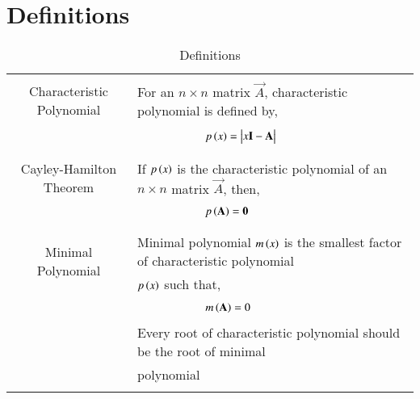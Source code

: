 \documentclass[journal,12pt]{IEEEtran}
\begin{document}
\section{\textbf{Definitions}}
\renewcommand{\thetable}{1}
\begin{table}[ht!]
\centering
\begin{tabular}{|c|l|}
    \hline
	\multirow{3}{*}{Characteristic Polynomial} 
	& \\
	& For an $n\times n$ matrix $\vec{A}$, characteristic polynomial is defined by,\\
	&\\
	& $\qquad\qquad\qquad p\brak{x}=\mydet{x\Vec{I}-\Vec{A}}$\\
	&\\
	\hline
	\multirow{3}{*}{Cayley-Hamilton Theorem}
    &\\
    & If $p\left(x\right)$ is the characteristic polynomial of an $n\times n$ matrix $\vec{A}$, then,\\
    &\\
    &$\qquad \qquad \qquad p\left(\mathbf{A}\right)=\mathbf{0}$\\
    &\\
    \hline
	\multirow{3}{*}{Minimal Polynomial} 
	&\\
	& Minimal polynomial $m\left(x\right)$ is the smallest factor of characteristic polynomial\\
	& $p\left(x\right)$ such that,\\
	&\\
	& $\qquad \qquad \qquad m\left(\mathbf{A}\right)=0$\\
	& \\
	& Every root of characteristic polynomial should be the root of minimal\\
	& polynomial\\
	&\\
    \hline
\end{tabular}
\label{table:1}
    \caption{Definitions}
\end{table}
\newpage
\end{document}
